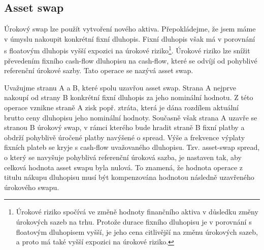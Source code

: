 \documentclass[a4paper]{book}
\begin{document}
\subsection{Asset swap}

Úrokový swap lze použít vytvoření nového aktiva. Přepokládejme, že jsem máme v úmyslu nakoupit konkrétní fixní dluhopis. Fixní dluhopis však má v porovnání s floatovým dluhopis vyšší expozici na úrokové riziko\footnote{Úrokové riziko spočívá ve změně hodnoty finančního aktiva v důsledku změny úrokových sazeb na trhu. Protože durace fixního dluhopisu je v porovnání s floatovým dluhopisem vyšší, je jeho cena citlivější na změnu úrokových sazeb,  a proto má také vyšší expozici na úrokové riziko.}. Úrokové riziko lze snížit převedením fixního cash-flow dluhopisu na cash-flow, které se odvíjí od pohyblivé referenční úrokové sazby. Tato operace se nazývá asset swap.

Uvažujme stranu A a B, které spolu uzavřou asset swap. Strana A nejprve nakoupí od strany B konkrétní fixní dluhopis za jeho nominální hodnotu. Z této operace vznikne straně A zisk popř. ztráta, která je dána rozdílem aktuální brutto ceny dluhopisu jeho nominální hodnoty. Současně však strana A uzavře se stranou B úrokový swap, v rámci kterého bude hradit straně B fixní platby a obdrží pohyblivě úročené platby navýšené o spread. Výše a frekvence výplaty fixních plateb se kryje s cash-flow uvažovaného dluhopisu. Tzv. asset-swap spread, o který se navyšuje pohyblivá referenční úroková sazba, je nastaven tak, aby celková hodnota asset swapu byla nulová. To znamená, že hodnota operace z titulu nákupu dluhopisu musí být kompenzována hodnotou následně uzavřeného úrokového swapu.
\end{document}
